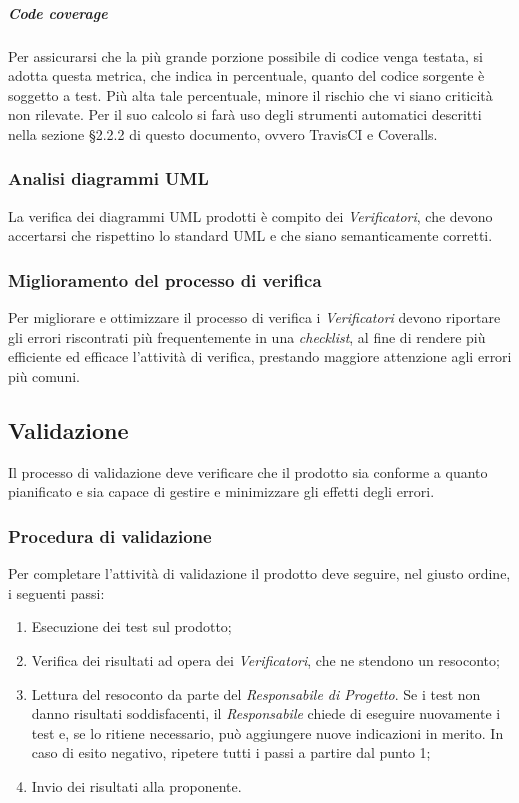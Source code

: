 \subparagraph{Code coverage}\Spazio
Per assicurarsi che la più grande porzione possibile di codice venga testata, si adotta questa metrica, che indica in percentuale, quanto del codice sorgente
è soggetto a test. Più alta tale percentuale, minore il rischio che vi siano criticità non rilevate.
Per il suo calcolo si farà uso degli strumenti automatici descritti nella sezione §2.2.2 di questo documento, ovvero TravisCI e Coveralls.

\subsubsection{Analisi diagrammi UML}
La verifica dei diagrammi UML prodotti è compito dei \emph{Verificatori}, che devono accertarsi che rispettino lo standard UML e che siano semanticamente corretti.

\subsubsection{Miglioramento del processo di verifica}
Per migliorare e ottimizzare il processo di verifica i \emph{Verificatori} devono riportare gli errori riscontrati più frequentemente in una \emph{checklist}, al fine di rendere più efficiente ed efficace l'attività di verifica, prestando maggiore attenzione agli errori più comuni.

\subsection{Validazione}
Il processo di validazione deve verificare che il prodotto sia conforme a quanto pianificato e sia capace di gestire e minimizzare gli effetti degli errori.
\subsubsection{Procedura di validazione}
Per completare l'attività di validazione il prodotto deve seguire, nel giusto ordine, i seguenti passi:
\begin{enumerate}
	\item Esecuzione dei test sul prodotto;
	\item Verifica dei risultati ad opera dei \emph{Verificatori}, che ne stendono un resoconto;
	\item Lettura del resoconto da parte del \emph{Responsabile di Progetto}. Se i test non danno risultati soddisfacenti, il \emph{Responsabile} chiede di eseguire nuovamente i test e, se lo ritiene necessario, può aggiungere nuove indicazioni in merito. In caso di esito negativo, ripetere tutti i passi a partire dal punto 1;
	\item Invio dei risultati alla proponente.
\end{enumerate}

\pagebreak
